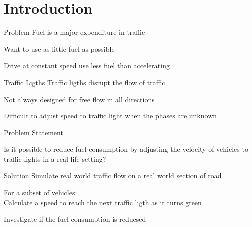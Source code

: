 

\section{Introduction}
\begin{frame}{Problem}
Fuel is a major expenditure in traffic
\vspace{5mm}

Want to use as little fuel as possible
\vspace{5mm}

Drive at constant speed use less fuel than accelerating
\end{frame}

\begin{frame}{Traffic Ligths}
Traffic ligths disrupt the flow of traffic
\vspace{5mm}

Not always designed for free flow in all directions
\vspace{5mm}

Difficult to adjust speed to traffic light when the phases are unknown
\end{frame}

\begin{frame}{Problem Statement}
\begin{center}
Is it possible to reduce fuel consumption by adjusting the velocity of vehicles to traffic lights in a real life setting?
\end{center}
\end{frame}

\begin{frame}{Solution}
Simulate real world traffic flow on a real world section of road
\vspace{5mm}

For a subset of vehicles:\\
Calculate a speed to reach the next traffic ligth as it turns green
\vspace{5mm}

Investigate if the fuel consumption is reducsed
\end{frame}

